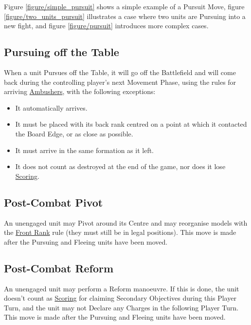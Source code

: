 Figure \ref{figure/simple_pursuit} shows a simple example of a Pursuit Move, figure \ref{figure/two_units_pursuit} illustrates a case where two units are Pursuing into a new fight, and figure \ref{figure/pursuit} introduces more complex cases.

\subsection{Pursuing off the Table}
\label{pursuing_off_the_table}

When a unit Pursues off the Table, it will go off the Battlefield and will come back during the controlling player's next Movement Phase, using the rules for arriving \hyperref[ambush]{Ambushers}, with the following exceptions:
\begin{itemize}[label={-}]
\item It automatically arrives.
\item It must be placed with its back rank centred on a point at which it contacted the Board Edge, or as close as possible. 
\item It must arrive in the same formation as it left.
\item It does not count as destroyed at the end of the game, nor does it lose \hyperref[scoring]{Scoring}.
\end{itemize}


\subsection{Post-Combat Pivot}
\label{post_combat_pivot}

An unengaged unit may Pivot around its Centre and may reorganise models with the \hyperref[front_rank]{Front Rank} rule (they must still be in legal positions). This move is made after the Pursuing and Fleeing units have been moved.

\subsection{Post-Combat Reform}
\label{post_combat_reform}

An unengaged unit may perform a Reform manoeuvre. If this is done, the unit doesn't count as \hyperref[scoring]{Scoring} for claiming Secondary Objectives during this Player Turn, and the unit may not Declare any Charges in the following Player Turn. This move is made after the Pursuing and Fleeing units have been moved.


\newcommand{\figSimplePursA}{a)}
\newcommand{\figSimplePursB}{b)}

